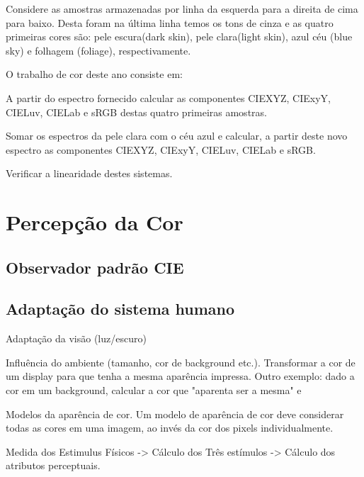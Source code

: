 \documentclass[a4paper,10pt]{report}
\begin{document}
\par
Considere as amostras armazenadas por linha da esquerda para a direita de cima
para baixo.  Desta foram na última linha temos os tons de cinza e as quatro
primeiras cores são: pele escura(dark skin), pele clara(light skin), azul céu
(blue sky) e folhagem (foliage), respectivamente.  

\par
O trabalho de cor deste ano consiste em:
\begin{list}{:~}{}
\item A partir do espectro fornecido calcular as componentes CIEXYZ,
CIExyY, CIELuv, CIELab e sRGB destas quatro primeiras amostras.
\item Somar os espectros da pele clara com o céu azul e calcular, a partir deste
novo espectro as componentes CIEXYZ, CIExyY, CIELuv, CIELab e sRGB.
\item Verificar a linearidade destes sistemas.
\end{list}

\section{Percepção da Cor}
\subsection{Observador padrão CIE}
\par


\subsection{Adaptação do sistema humano}
\par
Adaptação da visão (luz/escuro)

\par
Influência do ambiente (tamanho, cor de background etc.). Transformar a
cor de um display para que tenha a mesma aparência impressa. Outro exemplo:
dado a cor em um background, calcular a cor que "aparenta ser a mesma" e

\par
Modelos da aparência de cor. Um modelo de aparência de cor deve considerar
todas as cores em uma imagem, ao invés da cor dos pixels individualmente.

\par
Medida dos Estimulus Físicos -> Cálculo dos Três estímulos -> Cálculo dos
atributos perceptuais.
\end{document}
